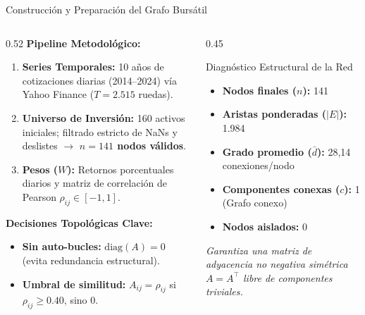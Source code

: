 \documentclass[aspectratio=169, 10pt]{beamer}
\begin{document}
	\begin{frame}{Construcción y Preparación del Grafo Bursátil}
		\begin{columns}[c]
			\begin{column}{0.52\textwidth}
				\textbf{Pipeline Metodológico:}
				\begin{enumerate}
					\item \textbf{Series Temporales:} 10 años de cotizaciones diarias (2014--2024) vía Yahoo Finance (\(T = 2.515\) ruedas).
					\item \textbf{Universo de Inversión:} 160 activos iniciales; filtrado estricto de NaNs y deslistes \(\to\) \textbf{\(n = 141\) nodos válidos}.
					\item \textbf{Pesos (\(W\)):} Retornos porcentuales diarios y matriz de correlación de Pearson \(\rho_{ij} \in [-1, 1]\).
				\end{enumerate}
				\vspace{0.2cm}
				\textbf{Decisiones Topológicas Clave:}
				\begin{itemize}
					\item \textbf{Sin auto-bucles:} \(\text{diag}(A) = 0\) (evita redundancia estructural).
					\item \textbf{Umbral de similitud:} \(A_{ij} = \rho_{ij}\) si \(\rho_{ij} \ge 0.40\), sino $0$.
				\end{itemize}
			\end{column}
			
			\begin{column}{0.45\textwidth}
				\begin{block}{Diagnóstico Estructural de la Red}
					\begin{itemize}
						\item \textbf{Nodos finales (\(n\)):} 141
						\item \textbf{Aristas ponderadas (\(|E|\)):} 1.984
						\item \textbf{Grado promedio (\(\bar{d}\)):} 28,14 conexiones/nodo
						\item \textbf{Componentes conexas (\(c\)):} 1 (Grafo conexo)
						\item \textbf{Nodos aislados:} 0
					\end{itemize}
				\end{block}
				\vspace{0.1cm}
				\small\textit{Garantiza una matriz de adyacencia no negativa simétrica \(A = A^\top\) libre de componentes triviales.}
			\end{column}
		\end{columns}

	\end{frame}
	
\end{document}
